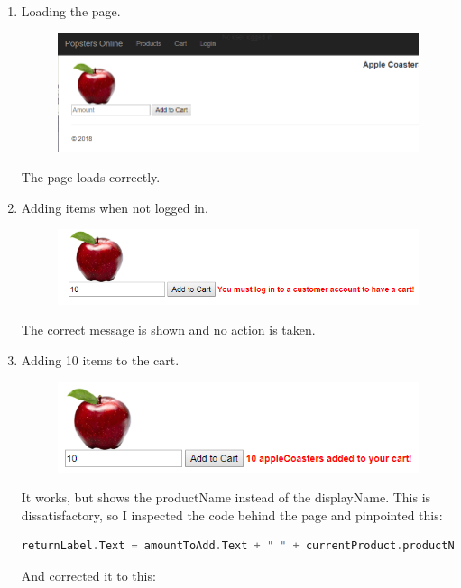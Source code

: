 ﻿\documentclass{article}
\begin{document}
    \begin{enumerate}
        \item Loading the page.
        \begin{figure}[H]
            \includegraphics{testing/product1.png}
            \centering
        \end{figure}
        The page loads correctly.
        \item Adding items when not logged in.
        \begin{figure}[H]
            \includegraphics{testing/product2.png}
            \centering
        \end{figure}
        The correct message is shown and no action is taken.
        \item Adding 10 items to the cart.
        \begin{figure}[H]
            \includegraphics{testing/product3.png}
            \centering
        \end{figure}
        It works, but shows the productName instead of the displayName.
        This is dissatisfactory, so I inspected the code behind the page and pinpointed this:
        \begin{lstlisting}[language=C]
returnLabel.Text = amountToAdd.Text + " " + currentProduct.productName + "s added to your cart!";
        \end{lstlisting}
        And corrected it to this:
        \begin{lstlisting}[language=C]

\end{lstlisting}
\end{enumerate}
\end{document}
